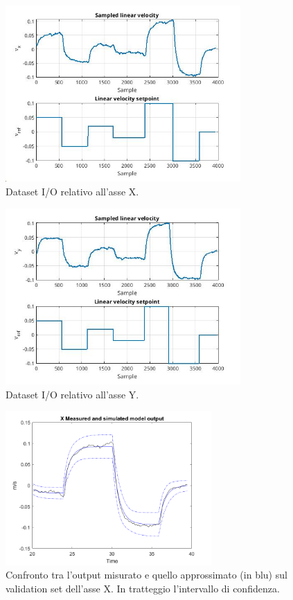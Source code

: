 \begin{figure}
    \centering
    \includegraphics[width=0.8\textwidth]{figs/chapter4/xdataset.jpg}
    \caption{Dataset I/O relativo all'asse X.}
    \label{fig:xdataset}
\end{figure}

\begin{figure}
    \centering
    \includegraphics[width=0.8\textwidth]{figs/chapter4/ydataset.jpg}
    \caption{Dataset I/O relativo all'asse Y.}
    \label{fig:ydataset}
\end{figure}

\begin{figure}
    \centering
    \includegraphics[width=0.7\textwidth]{figs/chapter4/valxtimeplot.png}
    \caption{Confronto tra l'output misurato e quello approssimato (in blu) sul validation set dell'asse X. In tratteggio l'intervallo di confidenza.}
    \label{fig:xvalerr}
\end{figure}

